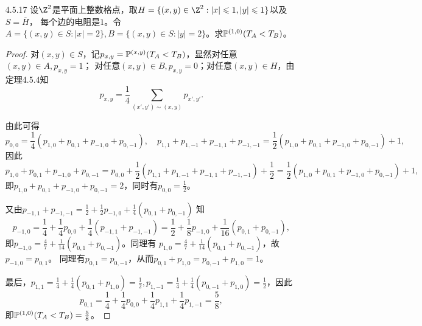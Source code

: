 \begin{enumerate}
\begin{proof}
        对于六角形格点网络，将其中所有某个方向的边全部短路后，所得电路图与$\Z^2$上简单随机游动等价，而后者常返，因而前者常返。

        对于三角形网络$\Delta$，取定一点$a_0$，定义路径距离
        \[d(x,y)=\inf\{n\in\Z_{\geqslant0}:\exists\:x_0,x_1,\cdots,x_n\st x_0=x\sim x_1\sim\cdots\sim x_n=y\},\]
        并对正整数$n$，记$P_n=\{x\in\Delta:d(x,a_0)=n\}$。将所有$P_n$中的点短路看成一个点$a_n$，
        则$a_n$有$6(2n+1)$条边连接$a_{n+1}$，其中每条边电导为$1$，故$c(a_n,a_{n+1})=6(2n+1)$，
        \[R_{\text{eff}}(a_0,+\infty)=\sum_{n=0}^\infty\frac{1}{6(2n+1)}=+\infty,\]
        因而短路前的$\Delta$常返。
    \end{proof}
    \item[4.5.17] 设$\Z^2$是平面上整数格点，取$H=\{(x,y)\in\Z^2:|x|\leqslant1,|y|\leqslant1\}$以及$S=\overline{H}$，
    每个边的电阻是$1$。令$A=\{(x,y)\in S:|x|=2\},B=\{(x,y)\in S:|y|=2\}$。求$\P^{(1,0)}(T_A<T_B)$。
    \begin{proof}
        对$(x,y)\in S$，记$p_{x,y}=\P^{(x,y)}(T_A<T_B)$，显然对任意$(x,y)\in A,p_{x,y}=1$；
        对任意$(x,y)\in B,p_{x,y}=0$；对任意$(x,y)\in H$，由定理4.5.4知
        \[p_{x,y}=\frac{1}{4}\sum_{(x',y')\sim(x,y)}p_{x',y'}.\]
        
        由此可得\[p_{0,0}=\frac{1}{4}(p_{1,0}+p_{0,1}+p_{-1,0}+p_{0,-1}),\quad
        p_{1,1}+p_{1,-1}+p_{-1,1}+p_{-1,-1}=\frac{1}{2}(p_{1,0}+p_{0,1}+p_{-1,0}+p_{0,-1})+1,\]
        因此\[p_{1,0}+p_{0,1}+p_{-1,0}+p_{0,-1}=p_{0,0}+\frac{1}{2}(p_{1,1}+p_{1,-1}+p_{-1,1}+p_{-1,-1})
        +\frac{1}{2}=\frac{1}{2}(p_{1,0}+p_{0,1}+p_{-1,0}+p_{0,-1})+1,\]
        即$p_{1,0}+p_{0,1}+p_{-1,0}+p_{0,-1}=2$，同时有$p_{0,0}=\frac{1}{2}$。

        又由$p_{-1,1}+p_{-1,-1}=\frac{1}{2}+\frac{1}{2}p_{-1,0}+\frac{1}{4}(p_{0,1}+p_{0,-1})$
        知\[p_{-1,0}=\frac{1}{4}+\frac{1}{4}p_{0,0}+\frac{1}{4}(p_{-1,1}+p_{-1,-1})=
        \frac{1}{2}+\frac{1}{8}p_{-1,0}+\frac{1}{16}(p_{0,1}+p_{0,-1}),\]
        即$p_{-1,0}=\frac{4}{7}+\frac{1}{14}(p_{0,1}+p_{0,-1})$。同理有
        $p_{1,0}=\frac{4}{7}+\frac{1}{14}(p_{0,1}+p_{0,-1})$，故$p_{-1,0}=p_{0,1}$。
        同理有$p_{0,1}=p_{0,-1}$，从而$p_{0,1}+p_{1,0}=p_{0,-1}+p_{1,0}=1$。

        最后，$p_{1,1}=\frac{1}{4}+\frac{1}{4}(p_{0,1}+p_{1,0})=\frac{1}{2},
        p_{1,-1}=\frac{1}{4}+\frac{1}{4}(p_{0,-1}+p_{1,0})=\frac{1}{2}$，因此
        \[p_{0,1}=\frac{1}{4}+\frac{1}{4}p_{0,0}+\frac{1}{4}p_{1,1}+\frac{1}{4}p_{1,-1}=\frac{5}{8},\]
        即$\P^{(1,0)}(T_A<T_B)=\frac{5}{8}$。
    \end{proof}
\end{enumerate}

